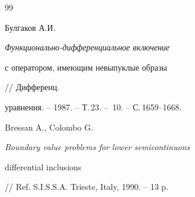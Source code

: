\begin{thebibliography}{99}


Булгаков А.И. {\em Функционально-дифференциальное включение


с оператором, имеющим невыпуклые образы} // Дифференц.


уравнения. -- 1987. -- Т.\,23. -- \No\,10. -- С.\,1659--1668.




Bressan A., Colombo G. {\em Boundary value problems for lower semicontinuons


differential inclusions} // Ref. S.I.S.S.A. Trieste, Italy, 1990. -- 13 p.





\end{thebibliography}





\vskip 2cm














\label{end}





